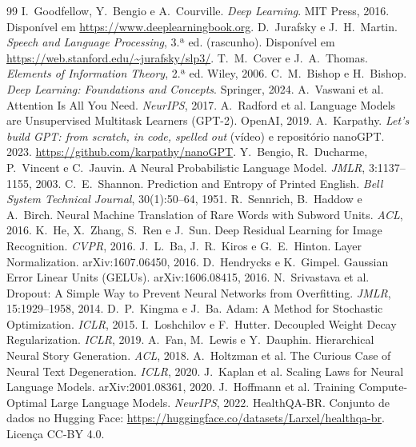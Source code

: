 \documentclass[11pt,a4paper]{article}
\begin{document}
\begin{thebibliography}{99}
 I.~Goodfellow, Y.~Bengio e A.~Courville. \emph{Deep Learning}. MIT Press, 2016. Disponível em \url{https://www.deeplearningbook.org}.
 D.~Jurafsky e J.~H.~Martin. \emph{Speech and Language Processing}, 3.ª ed. (rascunho). Disponível em \url{https://web.stanford.edu/~jurafsky/slp3/}.
 T.~M.~Cover e J.~A.~Thomas. \emph{Elements of Information Theory}, 2.ª ed. Wiley, 2006.
 C.~M.~Bishop e H.~Bishop. \emph{Deep Learning: Foundations and Concepts}. Springer, 2024.
 A.~Vaswani et al. Attention Is All You Need. \emph{NeurIPS}, 2017.
 A.~Radford et al. Language Models are Unsupervised Multitask Learners (GPT-2). OpenAI, 2019.
 A.~Karpathy. \emph{Let's build GPT: from scratch, in code, spelled out} (vídeo) e repositório nanoGPT. 2023. \url{https://github.com/karpathy/nanoGPT}.
 Y.~Bengio, R.~Ducharme, P.~Vincent e C.~Jauvin. A Neural Probabilistic Language Model. \emph{JMLR}, 3:1137--1155, 2003.
 C.~E.~Shannon. Prediction and Entropy of Printed English. \emph{Bell System Technical Journal}, 30(1):50--64, 1951.
 R.~Sennrich, B.~Haddow e A.~Birch. Neural Machine Translation of Rare Words with Subword Units. \emph{ACL}, 2016.
 K.~He, X.~Zhang, S.~Ren e J.~Sun. Deep Residual Learning for Image Recognition. \emph{CVPR}, 2016.
 J.~L.~Ba, J.~R.~Kiros e G.~E.~Hinton. Layer Normalization. arXiv:1607.06450, 2016.
 D.~Hendrycks e K.~Gimpel. Gaussian Error Linear Units (GELUs). arXiv:1606.08415, 2016.
 N.~Srivastava et al. Dropout: A Simple Way to Prevent Neural Networks from Overfitting. \emph{JMLR}, 15:1929--1958, 2014.
 D.~P.~Kingma e J.~Ba. Adam: A Method for Stochastic Optimization. \emph{ICLR}, 2015.
 I.~Loshchilov e F.~Hutter. Decoupled Weight Decay Regularization. \emph{ICLR}, 2019.
 A.~Fan, M.~Lewis e Y.~Dauphin. Hierarchical Neural Story Generation. \emph{ACL}, 2018.
 A.~Holtzman et al. The Curious Case of Neural Text Degeneration. \emph{ICLR}, 2020.
 J.~Kaplan et al. Scaling Laws for Neural Language Models. arXiv:2001.08361, 2020.
 J.~Hoffmann et al. Training Compute-Optimal Large Language Models. \emph{NeurIPS}, 2022.
 HealthQA-BR. Conjunto de dados no Hugging Face: \url{https://huggingface.co/datasets/Larxel/healthqa-br}. Licença CC-BY 4.0.
\end{thebibliography}
\end{document}
